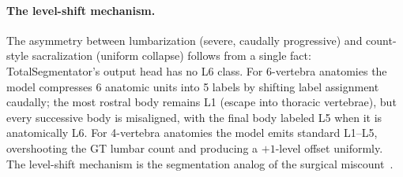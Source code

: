 \documentclass{article}
\newcommand{\dataset}{\textsc{CTSpinoPelvic1K}}
\newcommand{\SOTA}{TotalSegmentator}
\newcommand{\sota}{TS}
\begin{document}
\begin{table}[t]
\caption{\sota{} zero-shot stratified by LSTV phenotype on
\dataset{}, full-resolution mode. Junction DSC over a
40\,mm L5/S1 axial window. \textsc{L6} count: cases with
any L6 voxel emitted (structurally zero by label
vocabulary). $\dagger$: junction analysis not computed for
separate-mode records.}
\label{tab:sota_stratified}
\centering
\small
{}
\end{table}

\paragraph{The level-shift mechanism.}
The asymmetry between lumbarization (severe, caudally
progressive) and count-style sacralization (uniform
collapse) follows from a single fact: \SOTA{}'s output head
has no L6 class. For 6-vertebra anatomies the model
compresses 6 anatomic units into 5 labels by shifting label
assignment caudally; the most rostral body remains L1
(escape into thoracic vertebrae), but every successive body
is misaligned, with the final body labeled L5 when it is
anatomically L6. For 4-vertebra anatomies the model emits
standard L1--L5, overshooting the GT lumbar count and
producing a $+1$-level offset uniformly. The level-shift
mechanism is the segmentation analog of the surgical
miscount~\citep{Konin2010LumbosacralRelevance}.
\end{document}
